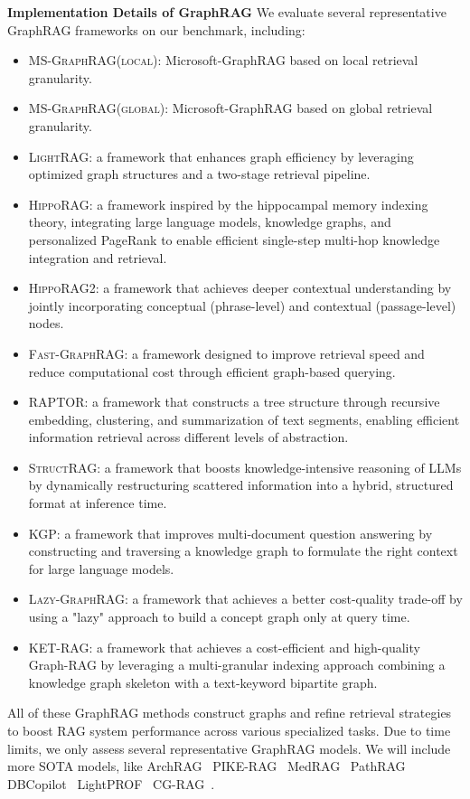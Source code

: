 \documentclass{article} %
\begin{document}
\textbf{Implementation Details of GraphRAG} We evaluate several representative GraphRAG frameworks on our benchmark, including:
\begin{itemize}
    \item \textsc{MS-GraphRAG(local)}: Microsoft-GraphRAG based on local retrieval granularity.
    \item \textsc{MS-GraphRAG(global)}: Microsoft-GraphRAG based on global retrieval granularity.
    \item \textsc{LightRAG}: a framework that enhances graph efficiency by leveraging optimized graph structures and a two-stage retrieval pipeline.
    \item \textsc{HippoRAG}: a framework inspired by the hippocampal memory indexing theory, integrating large language models, knowledge graphs, and personalized PageRank to enable efficient single-step multi-hop knowledge integration and retrieval.
    \item \textsc{HippoRAG2}: a framework that achieves deeper contextual understanding by jointly incorporating conceptual (phrase-level) and contextual (passage-level) nodes.
    \item \textsc{Fast-GraphRAG}: a framework designed to improve retrieval speed and reduce computational cost through efficient graph-based querying.
    \item \textsc{RAPTOR}: a framework that constructs a tree structure through recursive embedding, clustering, and summarization of text segments, enabling efficient information retrieval across different levels of abstraction.
    \item \textsc{StructRAG}: a framework that boosts knowledge-intensive reasoning of LLMs by dynamically restructuring scattered information into a hybrid, structured format at inference time.
    \item \textsc{KGP}: a framework that improves multi-document question answering by constructing and traversing a knowledge graph to formulate the right context for large language models.
    \item \textsc{Lazy-GraphRAG}: a framework that achieves a better cost-quality trade-off by using a "lazy" approach to build a concept graph only at query time.
    \item \textsc{KET-RAG}: a framework that achieves a cost-efficient and high-quality Graph-RAG by leveraging a multi-granular indexing approach combining a knowledge graph skeleton with a text-keyword bipartite graph.
\end{itemize}
All of these GraphRAG methods construct graphs and refine retrieval strategies to boost RAG system performance across various specialized tasks. Due to time limits, we only assess several representative GraphRAG models. We will include more SOTA models, like ArchRAG~\citep{wang2025archragattributedcommunitybasedhierarchical}
PIKE-RAG~\citep{wang2025pike}
MedRAG~\citep{zhao2025medrag}
PathRAG~\citep{chen2025pathrag}
DBCopilot~\citep{wang2025dbcopilot}
LightPROF~\citep{ao2025lightprof}
CG-RAG~\citep{hu2025cg}.
\end{document}
